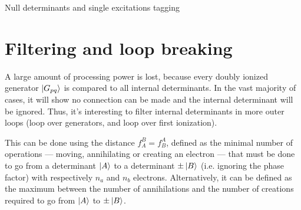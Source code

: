 \documentclass[./thesis.tex]{subfiles}
\begin{document}
\begin{algorithm}
        \caption{Null determinants and single excitations tagging}
        \label{alg:unblock_single}

                        
\end{algorithm}



\section{Filtering and loop breaking}

A large amount of processing power is lost, because every doubly ionized generator $\ket {G_{pq}}$ is compared to all internal determinants. In the vast majority of cases, it will show no connection can be made and the internal determinant will be ignored. Thus, it's interesting to filter internal determinants in more outer loops (loop over generators, and loop over first ionization).

This can be done using the distance $f_A^B = f_B^A$, defined as the minimal number of operations --- moving, annihilating or creating an electron --- that must be done to go from a determinant $\ket A$ to a determinant $\pm \ket B$ (i.e. ignoring the phase factor) with respectively $n_a$ and $n_b$ electrons.
Alternatively, it can be defined as the maximum between the number of annihilations and the number of creations required to go from $\ket A$ to $\pm \ket B$.
\end{document}
